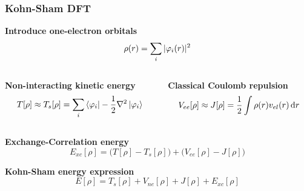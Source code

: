 \begin{frame}
    \frametitle{Kohn-Sham DFT}
    \centering
    \textbf{Introduce one-electron orbitals}
    \begin{equation}
	\nonumber
	\rho(r) = \sum_i |\varphi_i(r)|^2
    \end{equation}

    \vspace{5mm}

    \begin{columns}
    \begin{column}{.50\textwidth}
    \centering
    \textbf{Non-interacting kinetic energy}
    \begin{equation}
	\nonumber
	T[\rho] \approx T_s[\rho] = \sum_i \bra{\varphi_i}-\frac{1}{2}\nabla^2\ket{\varphi_i}
    \end{equation}
    \end{column}
    \begin{column}{.50\textwidth}
    \centering
    \textbf{Classical Coulomb repulsion}
    \begin{equation}
	\nonumber
	V_{ee}[\rho] \approx J[\rho] = \frac{1}{2} \int \rho(r)v_{el}(r)\,\mathrm{d} r
    \end{equation}
    \end{column}
    \end{columns}

    \vspace{8mm}

    \textbf{Exchange-Correlation energy}
    \begin{equation}
	\nonumber
	E_{xc}[\rho] = \Big(T[\rho] - T_s[\rho]\Big) + \Big(V_{ee}[\rho] - J[\rho]\Big)
    \end{equation}

    \vspace{5mm}

    \textbf{Kohn-Sham energy expression}
    \begin{equation}
	\nonumber
	E[\rho] = T_s[\rho] + V_{ne}[\rho] + J[\rho] + E_{xc}[\rho]
    \end{equation}
\end{frame}


